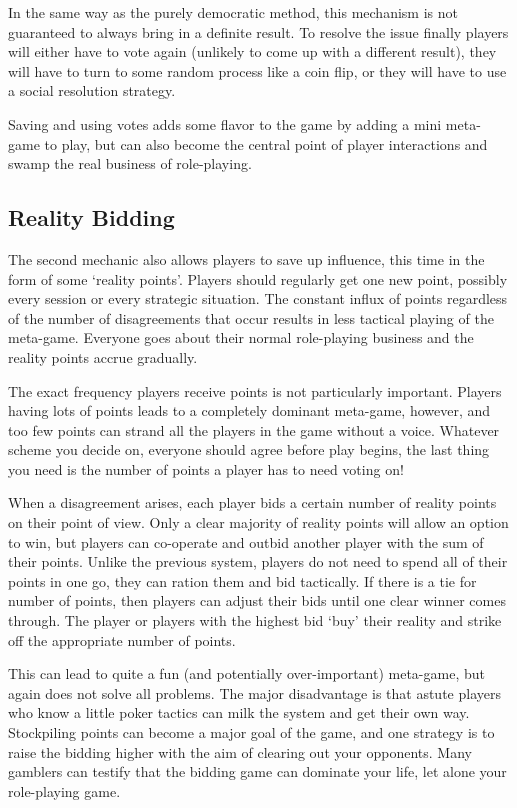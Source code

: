 \documentclass[twoside]{book}
\begin{document}
In the same way as the purely democratic method, this mechanism is not
guaranteed to always bring in a definite result. To resolve the issue
finally players will either have to vote again (unlikely to come up
with a different result), they will have to turn to some random
process like a coin flip, or they will have to use a social resolution
strategy.

Saving and using votes adds some flavor to the game by adding a mini
meta-game to play, but can also become the central point of player
interactions and swamp the real business of role-playing.

\subsection{Reality Bidding}

The second mechanic also allows players to save up influence, this
time in the form of some `reality points'. Players should regularly
get one new point, possibly every session or every strategic
situation. The constant influx of points regardless of the number of
disagreements that occur results in less tactical playing of the
meta-game. Everyone goes about their normal role-playing business and
the reality points accrue gradually.

The exact frequency players receive points is not particularly
important. Players having lots of points leads to a completely
dominant meta-game, however, and too few points can strand all the
players in the game without a voice. Whatever scheme you decide on,
everyone should agree before play begins, the last thing you need is
the number of points a player has to need voting on!

When a disagreement arises, each player bids a certain number of
reality points on their point of view. Only a clear majority of
reality points will allow an option to win, but players can co-operate
and outbid another player with the sum of their points. Unlike the
previous system, players do not need to spend all of their points in
one go, they can ration them and bid tactically. If there is a tie for
number of points, then players can adjust their bids until one clear
winner comes through. The player or players with the highest bid `buy'
their reality and strike off the appropriate number of points.

This can lead to quite a fun (and potentially over-important)
meta-game, but again does not solve all problems. The major
disadvantage is that astute players who know a little poker tactics
can milk the system and get their own way. Stockpiling points can
become a major goal of the game, and one strategy is to raise the
bidding higher with the aim of clearing out your opponents. Many
gamblers can testify that the bidding game can dominate your life, let
alone your role-playing game.
\end{document}
